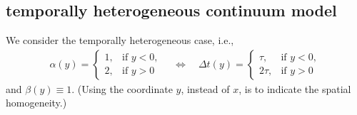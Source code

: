 \documentclass[a4paper,11pt]{article}
\theoremstyle{remark}
\begin{document}
\subsection{temporally heterogeneous continuum model}
We consider the temporally heterogeneous case, i.e.,
\begin{align*}
     \alpha(y) = \left\{\begin{array}{ll}
        1, & \text{if } y<0,\\
        2, & \text{if } y>0
        \end{array}\right. 
        \quad \Longleftrightarrow \quad
     \Delta t(y) = \left\{\begin{array}{ll}
        \tau, & \text{if } y<0,\\
        2\tau, & \text{if } y>0
        \end{array}\right.         
\end{align*}
and $\beta(y)\equiv 1$. (Using the coordinate $y$, instead of $x$, is to indicate the spatial homogeneity.)
\end{document}
